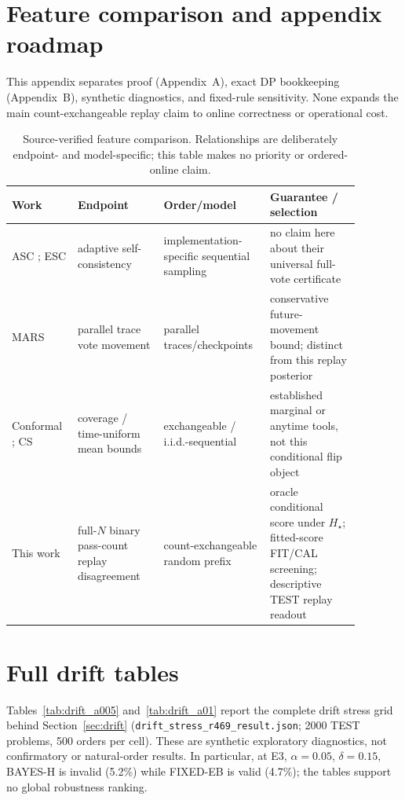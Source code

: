 \documentclass{article}
\theoremstyle{definition}
\theoremstyle{remark}
\newcommand{\trueH}{H_\star}
\begin{document}
\section{Feature comparison and appendix roadmap}
\label{app:positioning}
This appendix separates proof (Appendix~A), exact DP bookkeeping (Appendix~B),
synthetic diagnostics, and fixed-rule sensitivity. None expands the main
count-exchangeable replay claim to online correctness or operational cost.
\begin{table}[h]
\centering\footnotesize\setlength{\tabcolsep}{3pt}
\begin{tabular}{p{0.17\linewidth}p{0.23\linewidth}p{0.24\linewidth}p{0.24\linewidth}}
\toprule
Work & Endpoint & Order/model & Guarantee / selection \\
\midrule
ASC \citep{aggarwal2023asc}; ESC \citep{li2024esc} & adaptive self-consistency & implementation-specific sequential sampling & no claim here about their universal full-vote certificate \\
MARS \citep{chen2026mars} & parallel trace vote movement & parallel traces/checkpoints & conservative future-movement bound; distinct from this replay posterior \\
Conformal \citep{vovk2005algorithmic}; CS \citep{howard2021cs} & coverage / time-uniform mean bounds & exchangeable / i.i.d.-sequential & established marginal or anytime tools, not this conditional flip object \\
This work & full-$N$ binary pass-count replay disagreement & count-exchangeable random prefix & oracle conditional score under $\trueH$; fitted-score FIT/CAL screening; descriptive TEST replay readout \\
\bottomrule
\end{tabular}
\caption{Source-verified feature comparison. Relationships are deliberately
endpoint- and model-specific; this table makes no priority or ordered-online claim.}
\label{tab:feature-compare}
\end{table}

\section{Full drift tables}
\label{app:drift}
Tables~\ref{tab:drift_a005} and~\ref{tab:drift_a01} report the complete
drift stress grid behind Section~\ref{sec:drift}
(\texttt{drift\_stress\_r469\_result.json}; 2000 TEST problems, 500
orders per cell). These are synthetic exploratory diagnostics, not
confirmatory or natural-order results. In particular, at E3,
$\alpha=0.05$, $\delta=0.15$, BAYES-H is invalid (5.2\%) while FIXED-EB is
valid (4.7\%); the tables support no global robustness ranking.

\end{document}
